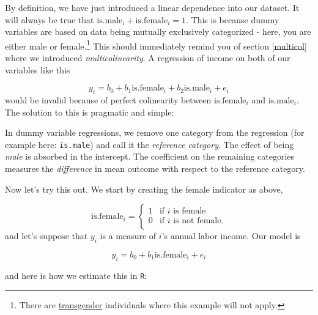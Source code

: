 \documentclass[]{book}
\newenvironment{Shaded}{\begin{snugshade}}{\end{snugshade}}
\newcommand{\KeywordTok}[1]{\textcolor[rgb]{0.13,0.29,0.53}{\textbf{#1}}}
\newcommand{\StringTok}[1]{\textcolor[rgb]{0.31,0.60,0.02}{#1}}
\newcommand{\CommentTok}[1]{\textcolor[rgb]{0.56,0.35,0.01}{\textit{#1}}}
\newcommand{\OperatorTok}[1]{\textcolor[rgb]{0.81,0.36,0.00}{\textbf{#1}}}
\newcommand{\NormalTok}[1]{#1}
\let\rmarkdownfootnote\footnote%
\def\footnote{\protect\rmarkdownfootnote}
\newenvironment{tip}{\begin{tcolorbox}[colback=green!5!white,colframe=green,title=\textbf{Tip:}]}{\end{tcolorbox}}
\theoremstyle{definition}
\theoremstyle{definition}
\theoremstyle{definition}
\theoremstyle{remark}
\begin{document}
By definition, we have just introduced a linear dependence into our
dataset. It will always be true that
\(\text{is.male}_i + \text{is.female}_i = 1\). This is because dummy
variables are based on data being mutually exclusively categorized -
here, you are either male or female.\footnote{There are
  \href{https://en.wikipedia.org/wiki/Transgender}{transgender}
  individuals where this example will not apply.} This should
immediately remind you of section \ref{multicol} where we introduced
\emph{multicolinearity}. A regression of income on both of our variables
like this

\[
y_i = b_0 + b_1 \text{is.female}_i + b_2 \text{is.male}_i + e_i
\] would be invalid because of perfect colinearity between
\(\text{is.female}_i\) and \(\text{is.male}_i\). The solution to this is
pragmatic and simple:

\begin{tip}
In dummy variable regressions, we remove one category from the
regression (for example here: \texttt{is.male}) and call it the
\emph{reference category}. The effect of being \emph{male} is absorbed
in the intercept. The coefficient on the remaining categories measures
the \emph{difference} in mean outcome with respect to the reference
category.
\end{tip}

Now let's try this out. We start by creating the female indicator as
above,

\[
\text{is.female}_i = \begin{cases}
          1 & \text{if }i\text{ is female} \\
            0 & \text{if }i\text{ is not female}. \\
   \end{cases}
\] and let's suppose that \(y_i\) is a measure of \(i\)'s annual labor
income. Our model is

\[
y_i = b_0 + b_1 \text{is.female}_i + e_i \label{eq:dummy-reg}
\]

and here is how we estimate this in \texttt{R}:

\begin{Shaded}
\end{Shaded}
\end{document}
